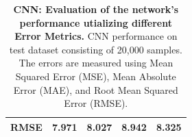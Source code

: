 \documentclass[a4paper, UKenglish, 11pt]{uiomaster}
\begin{document}
\begin{table}[!htb]
\begin{tabular}{l|cccc|}
\multicolumn{1}{|l|}{\cellcolor[HTML]{EFEFEF}RMSE} & \multicolumn{1}{c|}{7.971}                                                                                  & \multicolumn{1}{c|}{8.027}                                                                                   & \multicolumn{1}{c|}{8.942}                                                                                   & 8.325                                                                                                              \\ \hline
\end{tabular}
\caption{\textbf{CNN: Evaluation of the network's performance utializing different Error Metrics.} \newline
CNN performance on test dataset consisting of 20,000 samples. The errors are measured using Mean Squared Error (MSE), Mean Absolute Error (MAE), and Root Mean Squared Error (RMSE).}
\label{table:error_multiple_dipoles}
\end{table}

%
\end{document}
